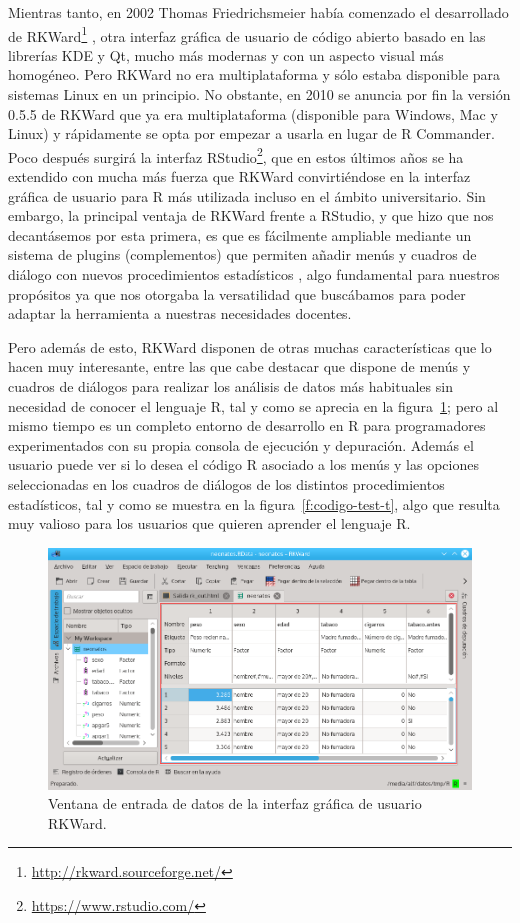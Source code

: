 \documentclass[a4paper,10pt,twoside]{article}
\newcommand{\rkward}{\textsf{RKWard}}
\begin{document}
Mientras tanto, en 2002 Thomas Friedrichsmeier había comenzado el desarrollado de
\rkward{}\footnote{\url{http://rkward.sourceforge.net/}} \cite{rodiger2012rkward}, otra interfaz gráfica de usuario de
código abierto basado en las librerías KDE y Qt, mucho más modernas y con un aspecto visual más homogéneo.
Pero \rkward{} no era multiplataforma y sólo estaba disponible para sistemas Linux en un principio.
No obstante, en 2010 se anuncia por fin la versión 0.5.5 de \rkward{} que ya era multiplataforma (disponible para
Windows, Mac y Linux) y rápidamente se opta por empezar a usarla en lugar de \textsf{R Commander}.
Poco después surgirá la interfaz \textsf{RStudio}\footnote{\url{https://www.rstudio.com/}}, que en estos últimos
años se ha extendido con mucha más fuerza que \rkward{} convirtiéndose en la interfaz gráfica de usuario para R más
utilizada incluso en el ámbito universitario.
Sin embargo, la principal ventaja de \rkward{} frente a \textsf{RStudio}, y que hizo que nos decantásemos por esta
primera, es que es fácilmente ampliable mediante un sistema de plugins (complementos) que permiten añadir menús y
cuadros de diálogo con nuevos procedimientos estadísticos \cite{friedrichsmeier2011introduction}, algo fundamental para
nuestros propósitos ya que nos otorgaba la versatilidad que buscábamos para poder adaptar la herramienta a nuestras
necesidades docentes.

Pero además de esto, \rkward{} disponen de otras muchas características que lo hacen muy interesante, entre las que cabe
destacar que dispone de menús y cuadros de diálogos para realizar los análisis de datos más habituales sin necesidad de
conocer el lenguaje R, tal y como se aprecia en la figura~\ref{f:ventana-datos-rkward}; pero al mismo tiempo es un
completo entorno de desarrollo en R para programadores experimentados con su propia consola de ejecución y depuración.
Además el usuario puede ver si lo desea el código R asociado a los menús y las opciones seleccionadas en los
cuadros de diálogos de los distintos procedimientos estadísticos, tal y como se muestra en la
figura~\ref{f:codigo-test-t}, algo que resulta muy valioso para los usuarios que quieren aprender el lenguaje R.

\begin{figure}[htbp!]
\centering
\includegraphics[width=\textwidth]{img/ventana_datos_rkward.png}
\caption{Ventana de entrada de datos de la interfaz gráfica de usuario \rkward{}.}
\label{f:ventana-datos-rkward}
\end{figure}
\end{document}
